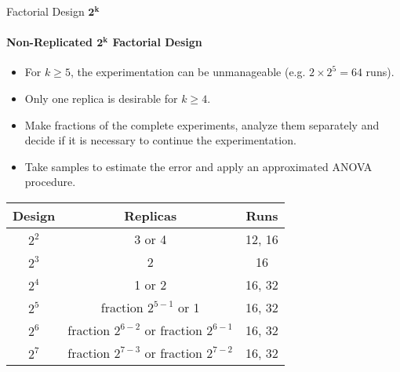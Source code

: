 \begin{frame}{Factorial Design $\pmb{2^k}$}
\framesubtitle{Non-Replicated $\pmb{2^k}$ Factorial Design}
\begin{itemize}
    \item For $k\geq5$, the experimentation can be unmanageable (e.g. $2\times2^5=64$ runs).
    \item Only one replica is desirable for $k\geq4$.
    \item Make fractions of the complete experiments, analyze them separately and decide if it is necessary to continue the experimentation.
    \item Take samples to estimate the error and apply an approximated ANOVA procedure.
\end{itemize}
\begin{table}[]
\centering
\begin{tabular}{ccc}
\hline
\textbf{Design} & \textbf{Replicas}                        & \textbf{Runs} \\ \hline
$2^2$           & 3 or 4                                   & 12, 16        \\
$2^3$           & 2                                        & 16            \\
$2^4$           & 1 or 2                                   & 16, 32        \\
$2^5$           & fraction $2^{5-1}$ or 1                  & 16, 32        \\
$2^6$           & fraction $2^{6-2}$ or fraction $2^{6-1}$ & 16, 32        \\
$2^7$           & fraction $2^{7-3}$ or fraction $2^{7-2}$ & 16, 32        \\ \hline
\end{tabular}
\end{table}
\end{frame}

